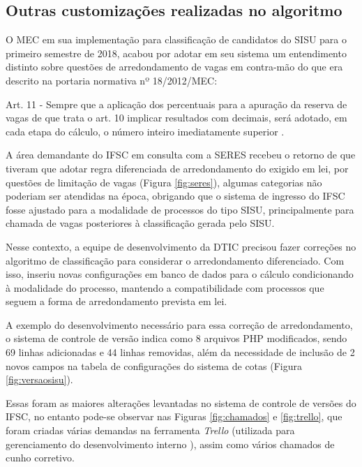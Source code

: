 \subsection{Outras customizações realizadas no algoritmo}
\label{outrasVersoes}

O \gls{MEC} em sua implementação para classificação de candidatos do \gls{SISU} para o primeiro semestre de 2018, acabou por adotar em seu sistema um entendimento distinto sobre questões de arredondamento de vagas em contra-mão do que era descrito na portaria normativa nº 18/2012/MEC:

\begin{citacao}
Art. 11 - Sempre que a aplicação dos percentuais para a apuração da reserva de vagas de que trata o art. 10 implicar resultados com decimais, será adotado, em cada etapa do cálculo, o número inteiro imediatamente superior \cite{portarianr9}.
\end{citacao}



\newpage
A área demandante do \gls{IFSC} em consulta com a \gls{SERES} recebeu o retorno de que tiveram que adotar regra diferenciada de arredondamento do exigido em lei, por questões de limitação de vagas (Figura \ref{fig:seres}), algumas categorias não poderiam ser atendidas na época, obrigando que o sistema de ingresso do \gls{IFSC} fosse ajustado para a modalidade de processos do tipo \gls{SISU}, principalmente para chamada de vagas posteriores à classificação gerada pelo \gls{SISU}.

Nesse contexto, a equipe de desenvolvimento da \gls{DTIC} precisou fazer correções no algoritmo de classificação para considerar o arredondamento diferenciado. Com isso, inseriu novas configurações em banco de dados para o cálculo condicionando à modalidade do processo, mantendo a compatibilidade com processos que seguem a forma de arredondamento prevista em lei.

A exemplo do desenvolvimento necessário para essa correção de arredondamento, o sistema de controle de versão indica como 8 arquivos PHP modificados, sendo 69 linhas adicionadas e 44 linhas removidas, além da necessidade de inclusão de 2 novos campos na tabela de configurações do sistema de cotas (Figura \ref{fig:versaosisu}).



\newpage
Essas foram as maiores alterações levantadas no sistema de controle de versões do \gls{IFSC}, no entanto pode-se observar nas Figuras \ref{fig:chamados} e \ref{fig:trello}, que foram criadas várias demandas na ferramenta \textit{Trello} (utilizada para gerenciamento do desenvolvimento interno ), assim como vários chamados de cunho corretivo.  

